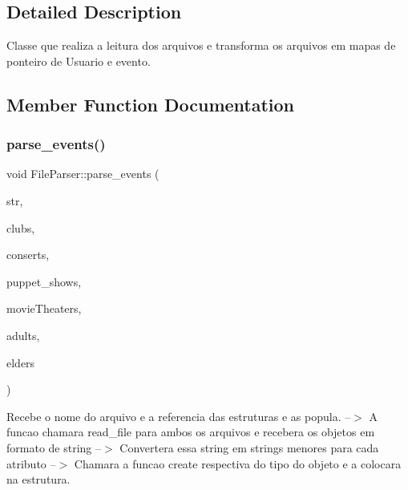 \subsection{Detailed Description}
Classe que realiza a leitura dos arquivos e transforma os arquivos em mapas de ponteiro de Usuario e evento. 

\subsection{Member Function Documentation}
\mbox{\label{class_file_parser_a4aacd1cee3ccf913ab98faca60879f35}} 
\subsubsection{\texorpdfstring{parse\+\_\+events()}{parse\_events()}}
{\footnotesize\ttfamily void File\+Parser\+::parse\+\_\+events (\begin{DoxyParamCaption}\item[{char $\ast$}]{str,  }\item[{std\+::map$<$ int, \hyperlink{class_club}{Club} $\ast$$>$ \&}]{clubs,  }\item[{std\+::map$<$ int, \hyperlink{class_consert}{Consert} $\ast$$>$ \&}]{conserts,  }\item[{std\+::map$<$ int, \hyperlink{class_puppet_show}{Puppet\+Show} $\ast$$>$ \&}]{puppet\+\_\+shows,  }\item[{std\+::map$<$ int, \hyperlink{class_movie_theater}{Movie\+Theater} $\ast$$>$ \&}]{movie\+Theaters,  }\item[{std\+::map$<$ int, \hyperlink{class_adult}{Adult} $\ast$$>$ \&}]{adults,  }\item[{std\+::map$<$ int, \hyperlink{class_elder}{Elder} $\ast$$>$ \&}]{elders }\end{DoxyParamCaption})\hspace{0.3cm}{\ttfamily [static]}}



Recebe o nome do arquivo e a referencia das estruturas e as popula. --$>$ A funcao chamara read\+\_\+file para ambos os arquivos e recebera os objetos em formato de string --$>$ Convertera essa string em strings menores para cada atributo --$>$ Chamara a funcao create respectiva do tipo do objeto e a colocara na estrutura. 

